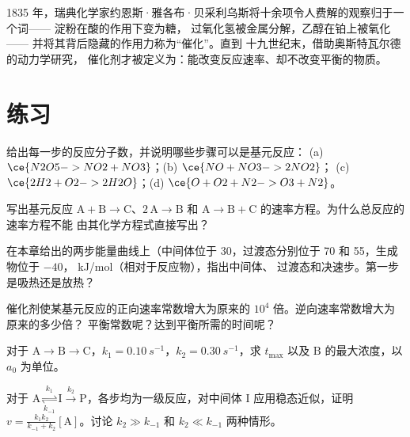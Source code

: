 \begin{history}[催化，1835 年]
1835 年，瑞典化学家约恩斯·雅各布·贝采利乌斯将十余项令人费解的观察归于一个词——
淀粉在酸的作用下变为糖，
过氧化氢被金属分解，乙醇在铂上被氧化——
并将其背后隐藏的作用力称为“催化”。直到
十九世纪末，借助奥斯特瓦尔德的动力学研究，
催化剂才被定义为：能改变反应速率、却不改变平衡的物质。
\end{history}

\section{练习}

\begin{exercise}[$\star$]\label{exo:b1:elementary-steps:1}
给出每一步的反应分子数，并说明哪些步骤可以是基元反应：
(a) $\ce{N2O5 -> NO2 + NO3}$；(b) $\ce{NO + NO3 -> 2NO2}$；
(c) $\ce{2H2 + O2 -> 2H2O}$；(d) $\ce{O + O2 + N2 -> O3 + N2}$。
\end{exercise}

\begin{exercise}[$\star$]\label{exo:b1:elementary-steps:2}
写出基元反应 $\mathrm{A} + \mathrm{B} \to
\mathrm{C}$、$2\,\mathrm{A} \to \mathrm{B}$ 和 $\mathrm{A} \to \mathrm{B} +
\mathrm{C}$ 的速率方程。为什么总反应的速率方程不能
由其化学方程式直接写出？
\end{exercise}

\begin{exercise}[$\star$]\label{exo:b1:elementary-steps:3}
在本章给出的两步能量曲线上（中间体位于
30，过渡态分别位于 70 和 55，生成物位于 $-40$，
\unit{kJ/mol}（相对于反应物），指出中间体、
过渡态和决速步。第一步是吸热还是放热？
\end{exercise}

\begin{exercise}[$\star$]\label{exo:b1:elementary-steps:4}
催化剂使某基元反应的正向速率常数增大为原来的
$10^4$ 倍。逆向速率常数增大为原来的多少倍？
平衡常数呢？达到平衡所需的时间呢？
\end{exercise}

\begin{exercise}[$\star\star$]\label{exo:b1:elementary-steps:5}
对于 $\mathrm{A} \to \mathrm{B} \to \mathrm{C}$，$k_1 =
\qty{0.10}{s^{-1}}$，$k_2 = \qty{0.30}{s^{-1}}$，求 $t_{\max}$ 以及
$\mathrm{B}$ 的最大浓度，以 $a_0$ 为单位。
\end{exercise}

\begin{exercise}[$\star\star$]\label{exo:b1:elementary-steps:6}
对于 $\mathrm{A} \underset{k_{-1}}{\overset{k_1}{\rightleftharpoons}}
\mathrm{I} \xrightarrow{k_2} \mathrm{P}$，各步均为一级反应，对中间体
$\mathrm{I}$ 应用稳态近似，证明 $v =
\frac{k_1k_2}{k_{-1} + k_2}[\mathrm{A}]$。讨论 $k_2 \gg
k_{-1}$ 和 $k_2 \ll k_{-1}$ 两种情形。
\end{exercise}

